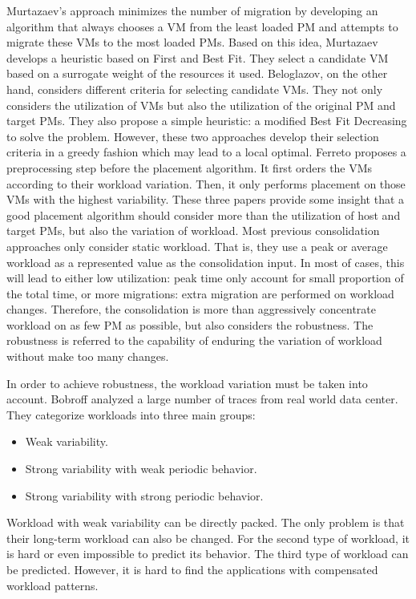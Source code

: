 Murtazaev's approach minimizes the number of migration by developing an algorithm that always chooses a VM from the least loaded PM and attempts to migrate these VMs to the most loaded PMs. 
Based on this idea, Murtazaev develops a heuristic based on First and Best Fit. They select a candidate VM based on a surrogate weight of the resources it used.
Beloglazov, on the other hand, considers different criteria for selecting candidate VMs. They not only considers the utilization of VMs but also the utilization of the original PM and target PMs. They also propose a simple heuristic: a modified Best Fit Decreasing to solve the problem. However, these two approaches develop their selection criteria in a greedy fashion which may lead to a local optimal. 
Ferreto proposes a preprocessing step before the placement algorithm. It first orders the VMs according to their workload variation. Then, it only performs placement on those VMs with  the highest variability. These three papers provide some insight that a good placement algorithm should consider more than the utilization of host and target PMs, but also the variation of workload. 
Most previous consolidation approaches \cite{Viswanathan:2012ej, Feller:2011vs} only consider static workload. That is, they use a peak or average workload as a represented value as the consolidation input. In most of cases, this will lead to either low utilization: peak time only account for small proportion of the total time, or more migrations: extra migration are performed on workload changes. 
Therefore, the consolidation is more than aggressively concentrate workload on as few PM as possible, but also considers the robustness. The robustness is referred to the capability of enduring the variation of workload without make too many changes.

In order to achieve robustness, the workload variation must be taken into account. Bobroff \cite{Bobroff:2007ec} analyzed a large number of traces from real world data center. They categorize workloads into three main groups: 

\begin{itemize}
	\item Weak variability.
	\item Strong variability with weak periodic behavior.
	\item Strong variability with strong periodic behavior.
\end{itemize}
Workload with weak variability can be directly packed. The only problem is that their long-term workload can also be changed. 
For the second type of workload, it is hard or even impossible to predict its behavior. The third type of workload can be predicted. However, it is hard to find the applications with compensated workload patterns. 

